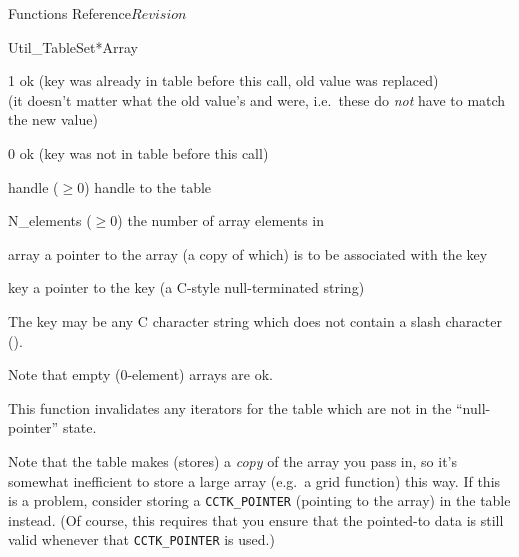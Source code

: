 \begin{cactuspart}{ Functions Reference}{}{$Revision$}
\begin{FunctionDescription}{Util\_TableSet*Array}
\begin{ResultSection}
\begin{Result}{\rm 1}
ok (key was already in table before this call, old value was replaced)\\
   (it doesn't matter what the old value's  and
     were, i.e.\ these do {\em not\/} have to match
    the new value)
\end{Result}
\begin{Result}{\rm 0}
ok (key was not in table before this call)
\end{Result}
\end{ResultSection}

\begin{ParameterSection}
\begin{Parameter}{handle ($\ge 0$)}
handle to the table
\end{Parameter}
\begin{Parameter}{N\_elements ($\ge 0$)}
the number of array elements in 
\end{Parameter}
\begin{Parameter}{array}
a pointer to the array (a copy of which) is to be associated with the key
\end{Parameter}
\begin{Parameter}{key}
a pointer to the key (a C-style null-terminated string)
\end{Parameter}
\end{ParameterSection}

\begin{Discussion}
The key may be any C character string which does not contain a slash
character ().

Note that empty (0-element) arrays are ok.

This function invalidates any iterators for the table which are
not in the ``null-pointer'' state.

Note that the table makes (stores) a \emph{copy} of the array
you pass in, so it's somewhat inefficient to store a large array
(e.g.~a grid function) this way.  If this is a problem, consider
storing a \verb|CCTK_POINTER| (pointing to the array) in the table
instead.  (Of course, this requires that you ensure that the pointed-to
data is still valid whenever that \verb|CCTK_POINTER| is used.)
\end{Discussion}


\end{FunctionDescription}
\end{cactuspart}
